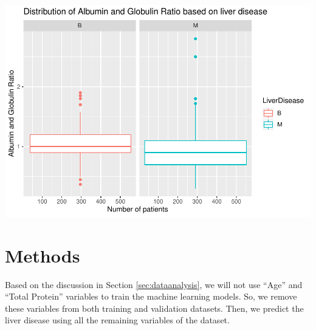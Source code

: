 \documentclass[]{article}
\newenvironment{Shaded}{\begin{snugshade}}{\end{snugshade}}
\newcommand{\CommentTok}[1]{\textcolor[rgb]{0.56,0.35,0.01}{\textit{#1}}}
\newcommand{\DataTypeTok}[1]{\textcolor[rgb]{0.13,0.29,0.53}{#1}}
\newcommand{\KeywordTok}[1]{\textcolor[rgb]{0.13,0.29,0.53}{\textbf{#1}}}
\newcommand{\NormalTok}[1]{#1}
\newcommand{\OperatorTok}[1]{\textcolor[rgb]{0.81,0.36,0.00}{\textbf{#1}}}
\newcommand{\StringTok}[1]{\textcolor[rgb]{0.31,0.60,0.02}{#1}}
\begin{document}
\begin{Shaded}
\end{Shaded}

\includegraphics{LiverDisease_files/figure-latex/unnamed-chunk-23-1.pdf}

\section{Methods}
\label{sec:methods}

Based on the discussion in Section \ref{sec:dataanalysis}, we will not
use ``Age'' and ``Total Protein'' variables to train the machine
learning models. So, we remove these variables from both training and
validation datasets. Then, we predict the liver disease using all the
remaining variables of the dataset.
\end{document}
